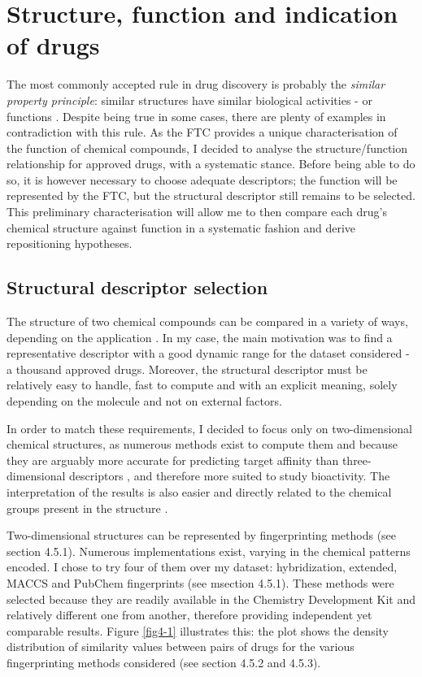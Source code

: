 \section{Structure, function and indication of drugs}
The most commonly accepted rule in drug discovery is probably the \emph{similar property principle}: similar structures have similar biological activities - or functions \citep{martin2002structurally} \citep{kubinyi1998similarity} \citep{johnson1990concepts}. Despite being true in some cases, there are plenty of examples in contradiction with this rule. As the FTC provides a unique characterisation of the function of chemical compounds, I decided to analyse the structure/function relationship for approved drugs, with a systematic stance. Before being able to do so, it is however necessary to choose adequate descriptors; the function will be represented by the FTC, but the structural descriptor still remains to be selected. This preliminary characterisation will allow me to then compare each drug's chemical structure against function in a systematic fashion and derive repositioning hypotheses.

\subsection{Structural descriptor selection}
The structure of two chemical compounds can be compared in a variety of ways, depending on the application \citep{johnson1990concepts}. In my case, the main motivation was to find a representative descriptor with a good dynamic range for the dataset considered - a thousand approved drugs. Moreover, the structural descriptor must be relatively easy to handle, fast to compute and with an explicit meaning, solely depending on the molecule and not on external factors.

In order to match these requirements, I decided to focus only on two-dimensional chemical structures, as numerous methods exist to compute them and because they are arguably more accurate for predicting target affinity than three-dimensional descriptors \citep{nettles2006bridging}, and therefore more suited to study bioactivity. The interpretation of the results is also easier and directly related to the chemical groups present in the structure \citep{todeschini2009molecular}.

Two-dimensional structures can be represented by fingerprinting methods (see section 4.5.1). Numerous implementations exist, varying in the chemical patterns encoded. I chose to try four of them over my dataset: hybridization, extended, MACCS and PubChem fingerprints (see msection 4.5.1). These methods were selected because they are readily available in the Chemistry Development Kit \citep{steinbeck2003chemistry} and relatively different one from another, therefore providing independent yet comparable results. Figure \ref{fig4-1} illustrates this: the plot shows the density distribution of similarity values between pairs of drugs for the various fingerprinting methods considered (see section 4.5.2 and 4.5.3).

